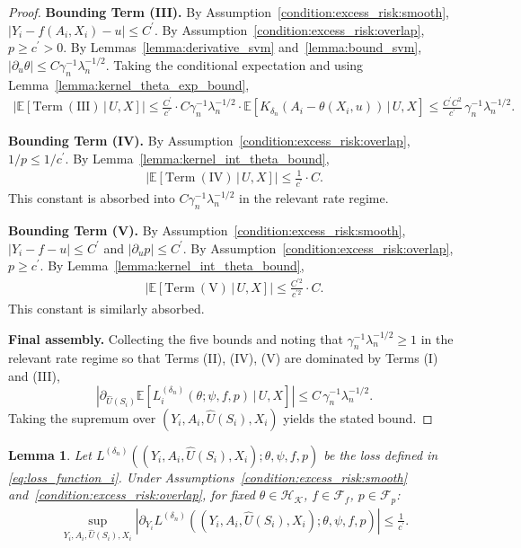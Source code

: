 \documentclass[12pt]{article}
\newtheorem{lemma}{Lemma}%
\newcommand{\E}{\mathbb{E}}
\begin{document}
\begin{proof}
\noindent\textbf{Bounding Term (III).}
By Assumption~\ref{condition:excess_risk:smooth}, $|Y_i-f(A_i,X_i)-u|\leq C^\prime$.  By Assumption~\ref{condition:excess_risk:overlap}, $p\geq c^\prime>0$.  By Lemmas~\ref{lemma:derivative_svm} and~\ref{lemma:bound_svm}, $|\partial_u\theta|\leq C\gamma_n^{-1}\lambda_n^{-1/2}$.  Taking the conditional expectation and using Lemma~\ref{lemma:kernel_theta_exp_bound},
\begin{align*}
\left|\E\!\left[\mathrm{Term\ (III)}\,\big|\,U,X\right]\right|
\leq \frac{C^\prime}{c^\prime}\cdot C\gamma_n^{-1}\lambda_n^{-1/2}\cdot\E\!\left[K_{\delta_n}(A_i-\theta(X_i,u))\,\big|\,U,X\right]
\leq \frac{C^\prime C^2}{c^\prime}\,\gamma_n^{-1}\lambda_n^{-1/2}.
\end{align*}

\noindent\textbf{Bounding Term (IV).}
By Assumption~\ref{condition:excess_risk:overlap}, $1/p\leq 1/c^\prime$.  By Lemma~\ref{lemma:kernel_int_theta_bound},
\begin{align*}
\left|\E\!\left[\mathrm{Term\ (IV)}\,\big|\,U,X\right]\right|
\leq \frac{1}{c^\prime}\cdot C.
\end{align*}
This constant is absorbed into $C\gamma_n^{-1}\lambda_n^{-1/2}$ in the relevant rate regime.

\noindent\textbf{Bounding Term (V).}
By Assumption~\ref{condition:excess_risk:smooth}, $|Y_i-f-u|\leq C^\prime$ and $|\partial_u p|\leq C^\prime$.  By Assumption~\ref{condition:excess_risk:overlap}, $p\geq c^\prime$.  By Lemma~\ref{lemma:kernel_int_theta_bound},
\begin{align*}
\left|\E\!\left[\mathrm{Term\ (V)}\,\big|\,U,X\right]\right|
\leq \frac{C^{\prime 2}}{c^{\prime 2}}\cdot C.
\end{align*}
This constant is similarly absorbed.

\noindent\textbf{Final assembly.}
Collecting the five bounds and noting that $\gamma_n^{-1}\lambda_n^{-1/2}\geq 1$ in the relevant rate regime so that Terms (II), (IV), (V) are dominated by Terms (I) and (III),
$$\left|\partial_{\widehat U(S_i)}\E\!\left[L^{(\delta_n)}_i(\theta;\psi,f,p)\,\big|\,U,X\right]\right|
\leq C\,\gamma_n^{-1}\lambda_n^{-1/2}.$$
Taking the supremum over $(Y_i,A_i,\widehat{U}(S_i),X_i)$ yields the stated bound.
\end{proof}

\begin{lemma}\label{lemma:L_i_derivative_Y}
    Let $L^{(\delta_n)}((Y_i,A_i,\widehat U(S_i),X_i);\theta,\psi,f,p)$ be the loss defined in \eqref{eq:loss_function_i}.  Under Assumptions~\ref{condition:excess_risk:smooth} and~\ref{condition:excess_risk:overlap}, for fixed $\theta\in\mathcal{H}_\mathcal{K}$, $f\in\mathcal{F}_f$, $p\in\mathcal{F}_p$:
    \begin{align*}
        \sup_{Y_i,A_i,\widehat U(S_i),X_i}\left|\partial_{Y_i}L^{(\delta_n)}((Y_i,A_i,\widehat U(S_i),X_i);\theta,\psi,f,p)\right| \leq \frac{1}{c^\prime}.
    \end{align*}
\end{lemma}
\end{document}
